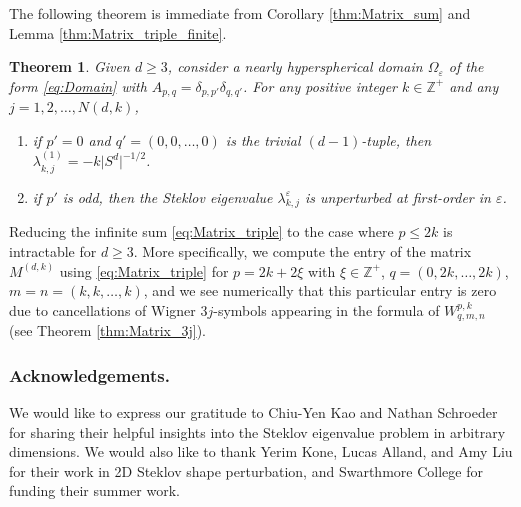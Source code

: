 \documentclass[11pt]{amsart}
\theoremstyle{definition}
\theoremstyle{plain}
\newtheorem{theorem}[definition]{Theorem}
\theoremstyle{remark}
\newcommand{\Z}{\mathbb{Z}}
\newcommand{\vareps}{\varepsilon}
\newcommand{\abs}[1]{\lvert{#1}\rvert}
\begin{document}
The following theorem is immediate from Corollary \ref{thm:Matrix_sum} and Lemma \ref{thm:Matrix_triple_finite}. 

\begin{theorem} \label{thm:Ypq} 
Given $d\ge 3$, consider a nearly hyperspherical domain $\Omega_\vareps$ of the form \eqref{eq:Domain} with $A_{p, q} = \delta_{p, p'}\delta_{q, q'}$. For any positive integer $k\in\Z^+$ and any $j = 1, 2, \dots, N(d, k)$, 
\begin{enumerate} 
\item if $p' = 0$ and $q' = (0, 0, \dots, 0)$ is the trivial $(d - 1)$-tuple, then $\lambda_{k, j}^{(1)} = -k\abs{S^d}^{-1/2}$. 
\item if $p'$ is odd, then the Steklov eigenvalue $\lambda_{k, j}^\vareps$ is unperturbed at first-order in $\vareps$. 
\end{enumerate} 
\end{theorem} 

Reducing the infinite sum \eqref{eq:Matrix_triple} to the case where $p\le 2k$ is intractable for $d\ge 3$. More specifically, we compute the entry of the matrix $M^{(d, k)}$ using \eqref{eq:Matrix_triple} for $p = 2k + 2\xi$ with $\xi\in\Z^+$, $q = (0, 2k, \dots, 2k)$, $m = n = (k, k, \dots, k)$, and we see numerically that this particular entry is zero due to cancellations of Wigner $3j$-symbols appearing in the formula of $W^{p, k}_{q, m, n}$ (see Theorem \ref{thm:Matrix_3j}).  


\subsubsection*{Acknowledgements.} We would like to express our gratitude to Chiu-Yen Kao and Nathan Schroeder for sharing their helpful insights into the Steklov eigenvalue problem in arbitrary dimensions. We would also like to thank Yerim Kone, Lucas Alland, and Amy Liu for their work in 2D Steklov shape perturbation, and Swarthmore College for funding their summer work. 


\printbibliography 
\end{document}
